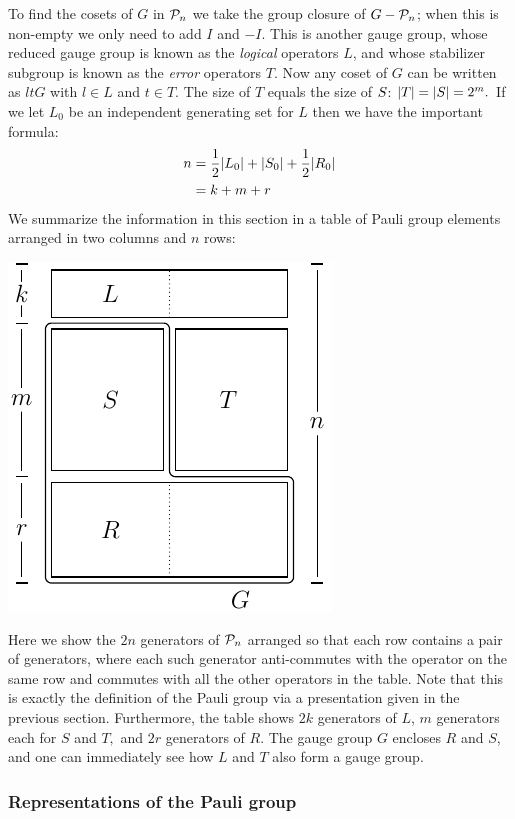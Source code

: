 \documentclass[12pt]{article}
\begin{document}
To find the cosets of $G$ in $\mathcal{P}_n$ we take
the group closure of $G-\mathcal{P}_n$; when this is non-empty
we only need to add $I$ and $-I.$
This is another
gauge group, whose reduced gauge group is known as
the {\it logical} operators $L$, and whose 
stabilizer subgroup is known as the {\it error} operators $T.$
Now any coset of $G$ can be written as $ltG$ with
$l\in L$ and $t\in T.$
The size of $T$ equals the size of $S$: $|T|=|S|=2^m.$
If we let $L_0$ be an independent generating set for $L$
then we have the important formula:
\begin{align}
n &= \frac{1}{2}|L_0| + |S_0| + \frac{1}{2}|R_0|\\
  &= k + m + r
\end{align}
We summarize the information in this section in a table
of Pauli group elements arranged in
two columns and $n$ rows:
\begin{center}
\includegraphics[]{pic-canonical.pdf}
\end{center}
Here we show the $2n$ generators of $\mathcal{P}_n$ arranged 
so that each row contains a pair of generators,
where each such generator anti-commutes with the operator on the same row and
commutes with all the other operators in the table.
Note that this is exactly the definition of the Pauli group
via a presentation given in the previous section.
Furthermore, the table shows $2k$ generators
of $L$, $m$ generators each for $S$ and $T,$ and $2r$
generators of $R.$
The gauge group $G$ encloses $R$ and $S$, and one can
immediately see how $L$ and $T$ also form a gauge group.


\subsubsection{Representations of the Pauli group}
\end{document}
